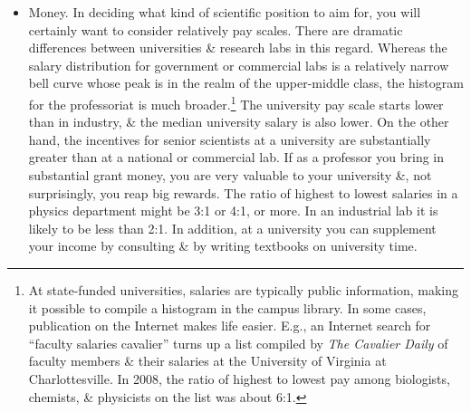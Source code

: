 \documentclass{article}
\begin{document}
\begin{enumerate}
\begin{itemize}
\begin{itemize}
			Apart from problems in dealing with management, 1 of the worst features of scientific life in many industrial \& government labs is a lack of helpers. Whereas a well-funded university professor can enlist an army of students \& postdocs to bring projects to fruition faster, a staff member at a research lab is lucky to have a technician \& an occasional postdoc. (This is much less of a problem in the biotech industry than in companies that perform physical research, according to my sources.) There are opportunities to alleviate such a shortage, e.g., by collaborating with a university research group. However, such opportunities must be aggressively pursued \& are unlikely in unfavorable geographic situations. Scientists who have dreams of attacking a problem from many sides at once will not be able to fulfill them at a government or industrial lab unless they can persuade colleagues to help.
			\item {\sf Money.} In deciding what kind of scientific position to aim for, you will certainly want to consider relatively pay scales. There are dramatic differences between universities \& research labs in this regard. Whereas the salary distribution for government or commercial labs is a relatively narrow bell curve whose peak is in the realm of the upper-middle class, the histogram for the professoriat is much broader.\footnote{At state-funded universities, salaries are typically public information, making it possible to compile a histogram in the campus library. In some cases, publication on the Internet makes life easier. E.g., an Internet search for ``faculty salaries cavalier'' turns up a list compiled by \textit{The Cavalier Daily} of faculty members \& their salaries at the University of Virginia at Charlottesville. In 2008, the ratio of highest to lowest pay among biologists, chemists, \& physicists on the list was about 6:1.} The university pay scale starts lower than in industry, \& the median university salary is also lower. On the other hand, the incentives for senior scientists at a university are substantially greater than at a national or commercial lab. If as a professor you bring in substantial grant money, you are very valuable to your university \&, not surprisingly, you reap big rewards. The ratio of highest to lowest salaries in a physics department might be 3:1 or 4:1, or more. In an industrial lab it is likely to be less than 2:1. In addition, at a university you can supplement your income by consulting \& by writing textbooks on university time.


\end{itemize}
\end{itemize}
\end{enumerate}
\end{document}
